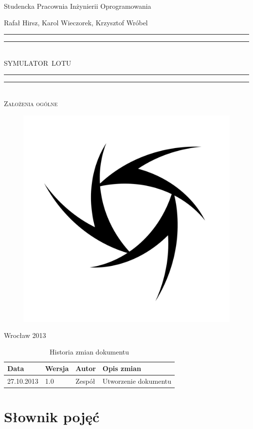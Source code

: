 \documentclass{mwrep}
\newcommand*{\titleGP}{\begingroup
\centering

{\Large Studencka Pracownia Inżynierii Oprogramowania}\par
\vspace*{16\baselineskip}

{\LARGE Rafał Hirsz, Karol Wieczorek, Krzysztof Wróbel\par}
\vspace*{\baselineskip}

\rule{\textwidth}{1.6pt}\vspace*{-\baselineskip}\vspace*{2pt}
\rule{\textwidth}{0.4pt}\\[\baselineskip]

{\Huge SYMULATOR~LOTU}\\[0.2\baselineskip]

\rule{\textwidth}{0.4pt}\vspace*{-\baselineskip}\vspace{3.2pt}
\rule{\textwidth}{1.6pt}\\[\baselineskip]

\scshape
{\huge Założenia ogólne}\par
\vspace*{2\baselineskip}

\begin{figure}[h]
\centering
\includegraphics[width=5\baselineskip]{flightsim-team-logo.pdf}
\end{figure}
\vfill

{\large Wrocław 2013}\par

\pagebreak

\endgroup}
\begin{document}
\thispagestyle{empty}
\titleGP

\begin{center}
\begin{table}[h]
\begin{center}
\begin{tabularx}{1\textwidth}{|l|l|l|X|}
\hline
Data & Wersja & Autor & Opis zmian \\ \hline
27.10.2013 & 1.0 & Zespół & Utworzenie dokumentu
\end{tabularx}
\end{center}
\vspace{3ex}
\caption{Historia zmian dokumentu}\label{T:Zmiany}
\end{table}
\end{center}

\pagebreak

\tableofcontents

\chapter{Słownik pojęć}
\end{document}
